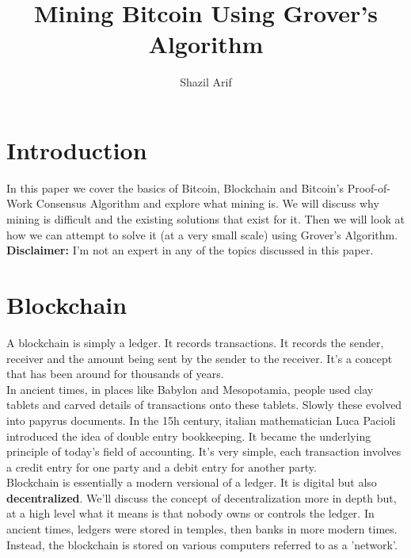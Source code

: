 \documentclass[11pt]{article} %
\title{Mining Bitcoin Using Grover's Algorithm}
\author{Shazil Arif}
\begin{document}
\maketitle

\tableofcontents

\section{Introduction}{}

In this paper we cover the basics of Bitcoin, Blockchain and Bitcoin's Proof-of-Work Consensus Algorithm and explore what mining is. We will discuss why mining is difficult and the existing solutions that exist for it. Then we will look at how we can attempt to solve it (at a very small scale) using Grover's Algorithm.\\


\noindent \textbf{Disclaimer:} I'm not an expert in any of the topics discussed in this paper.

\section{Blockchain}{}

A blockchain is simply a ledger. It records transactions. It records the sender, receiver and the amount being sent by the sender to the receiver. It's a concept that has been around for thousands of years.\\

\noindent In ancient times, in places like Babylon and Mesopotamia, people used clay tablets and carved details of transactions onto these tablets. Slowly these evolved into papyrus documents. In the 15h century, italian mathematician Luca Pacioli introduced the idea of double entry bookkeeping. It became the underlying principle of today's field of accounting. It's very simple, each transaction involves a credit entry for one party and a debit entry for another party.\\

\noindent Blockchain is essentially a modern versional of a ledger. It is digital but also \textbf{decentralized}. We'll discuss the concept of decentralization more in depth but, at a high level what it means is that nobody owns or controls the ledger. In ancient times, ledgers were stored in temples, then banks in more modern times. Instead, the blockchain is stored on various computers referred to as a 'network'.
\end{document}

